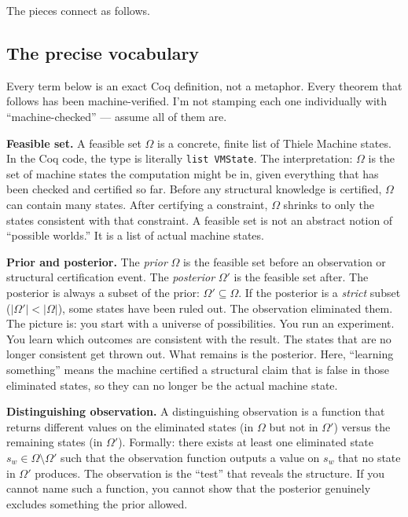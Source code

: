 \documentclass[11pt,a4paper]{article}
\theoremstyle{plain}
\theoremstyle{definition}
\theoremstyle{remark}
\begin{document}
The pieces connect as follows.

\subsection{The precise vocabulary}

Every term below is an exact Coq definition, not a metaphor. Every theorem that follows has been machine-verified. I'm not stamping each one individually with ``machine-checked'' --- assume all of them are.

\medskip
\noindent\textbf{Feasible set.}
A feasible set $\Omega$ is a concrete, finite list of Thiele Machine states. In the Coq code, the type is literally \texttt{list VMState}. The interpretation: $\Omega$ is the set of machine states the computation might be in, given everything that has been checked and certified so far. Before any structural knowledge is certified, $\Omega$ can contain many states. After certifying a constraint, $\Omega$ shrinks to only the states consistent with that constraint. A feasible set is not an abstract notion of ``possible worlds.'' It is a list of actual machine states.

\medskip
\noindent\textbf{Prior and posterior.}
The \emph{prior} $\Omega$ is the feasible set before an observation or structural certification event. The \emph{posterior} $\Omega'$ is the feasible set after. The posterior is always a subset of the prior: $\Omega' \subseteq \Omega$. If the posterior is a \emph{strict} subset ($|\Omega'| < |\Omega|$), some states have been ruled out. The observation eliminated them. The picture is: you start with a universe of possibilities. You run an experiment. You learn which outcomes are consistent with the result. The states that are no longer consistent get thrown out. What remains is the posterior. Here, ``learning something'' means the machine certified a structural claim that is false in those eliminated states, so they can no longer be the actual machine state.

\medskip
\noindent\textbf{Distinguishing observation.}
A distinguishing observation is a function that returns different values on the eliminated states (in $\Omega$ but not in $\Omega'$) versus the remaining states (in $\Omega'$). Formally: there exists at least one eliminated state $s_w \in \Omega \setminus \Omega'$ such that the observation function outputs a value on $s_w$ that no state in $\Omega'$ produces. The observation is the ``test'' that reveals the structure. If you cannot name such a function, you cannot show that the posterior genuinely excludes something the prior allowed.
\end{document}
